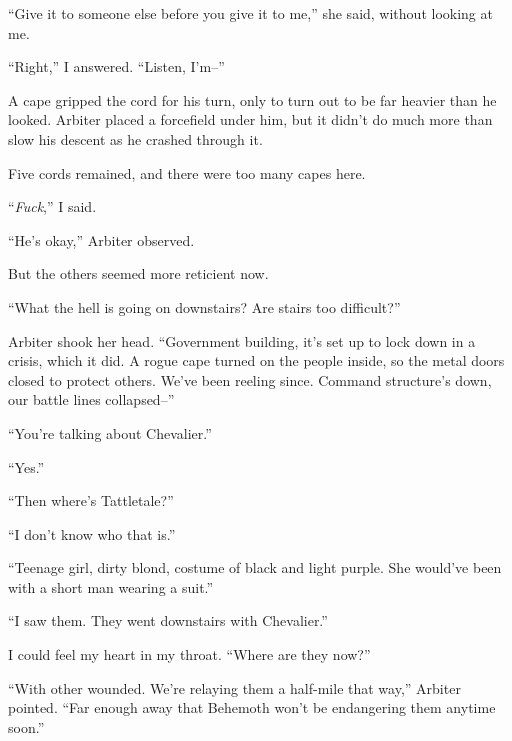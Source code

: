 ``Give it to someone else before you give it to me,'' she said, without looking at me.



``Right,'' I answered.  ``Listen, I'm--''



A cape gripped the cord for his turn, only to turn out to be far heavier than he looked.  Arbiter placed a forcefield under him, but it didn't do much more than slow his descent as he crashed through it.



Five cords remained, and there were too many capes here.



``\emph{Fuck},'' I said.



``He's okay,'' Arbiter observed.



But the others seemed more reticient now.



``What the hell is going on downstairs?  Are stairs too difficult?''



Arbiter shook her head.  ``Government building, it's set up to lock down in a crisis, which it did.  A rogue cape turned on the people inside, so the metal doors closed to protect others.  We've been reeling since.  Command structure's down, our battle lines collapsed--''



``You're talking about Chevalier.''



``Yes.''



``Then where's Tattletale?''



``I don't know who that is.''



``Teenage girl, dirty blond, costume of black and light purple.  She would've been with a short man wearing a suit.''



``I saw them.  They went downstairs with Chevalier.''



I could feel my heart in my throat.  ``Where are they now?''



``With other wounded.  We're relaying them a half-mile that way,'' Arbiter pointed.  ``Far enough away that Behemoth won't be endangering them anytime soon.''



